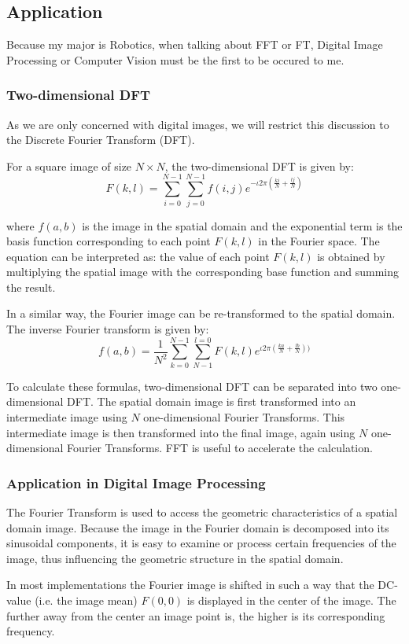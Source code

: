 \documentclass[12pt,a4paper]{article}
\begin{document}
\subsection{Application}
Because my major is Robotics, when talking about FFT or FT, Digital Image Processing or Computer Vision must be the first to be occured to me.
\subsubsection{Two-dimensional DFT}
As we are only concerned with digital images, we will restrict this discussion to the Discrete Fourier Transform (DFT).

For a square image of size $N\times N$, the two-dimensional DFT is given by:
$$F(k,l)=\sum_{i=0}^{N-1} \sum_{j=0}^{N-1} f(i,j) e^{-\iota 2\pi (\frac{ki}{N}+\frac{lj}{N})}$$

where $f(a,b)$ is the image in the spatial domain and the exponential term is the basis function corresponding to each point $F(k,l)$ in the Fourier space. The equation can be interpreted as: the value of each point $F(k,l)$ is obtained by multiplying the spatial image with the corresponding base function and summing the result.

In a similar way, the Fourier image can be re-transformed to the spatial domain. The inverse Fourier transform is given by:
$$f(a,b)=\dfrac{1}{N^2}\sum^{N-1}_{k=0} \sum_{N-1}^{l=0} F(k,l) e^{\iota 2\pi (\frac{ka}{N}+\frac{lb}{N}))}$$

To calculate these formulas, two-dimensional DFT can be separated into two one-dimensional DFT. The spatial domain image is first transformed into an intermediate image using $N$ one-dimensional Fourier Transforms. This intermediate image is then transformed into the final image, again using $N$ one-dimensional Fourier Transforms. FFT is useful to accelerate the calculation.

\subsubsection{Application in Digital Image Processing}
The Fourier Transform is used to access the geometric characteristics of a spatial domain image. Because the image in the Fourier domain is decomposed into its sinusoidal components, it is easy to examine or process certain frequencies of the image, thus influencing the geometric structure in the spatial domain.

In most implementations the Fourier image is shifted in such a way that the DC-value (i.e. the image mean) $F(0,0)$ is displayed in the center of the image. The further away from the center an image point is, the higher is its corresponding frequency.
\end{document}
